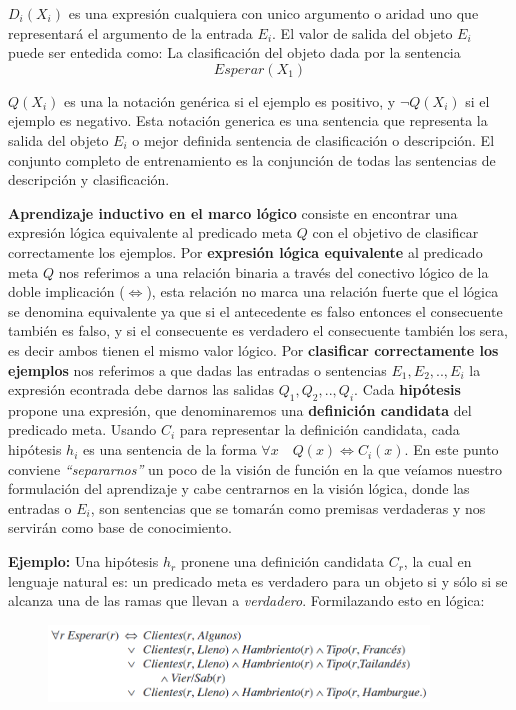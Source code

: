 \documentclass[12 pt, a4paper]{article}
\begin{document}
		\(D_{i}(X_{i})\) es una expresión cualquiera con unico argumento o aridad uno que representará el argumento de la entrada \(E_{i}\). El valor de salida del objeto \(E_{i}\) puede ser entedida como: La clasificación del objeto dada por la sentencia
			\[Esperar(X_{1})\]
			
		\(Q(X_{i})\) es una la notación genérica si el ejemplo es positivo, y \(\neg Q(X_{i})\) si el ejemplo es negativo. Esta notación generica es una sentencia que representa la salida del objeto \(E_{i}\) o mejor definida sentencia de clasificación o descripción. El conjunto completo de entrenamiento es la conjunción de todas las sentencias de descripción y clasificación.
		
		\textbf{Aprendizaje inductivo en el marco lógico} consiste en encontrar una expresión lógica equivalente al predicado meta \(Q\) con el objetivo de clasificar correctamente los ejemplos. Por \textbf{expresión lógica equivalente} al predicado meta \(Q\) nos referimos a una relación binaria a través del conectivo lógico de la doble implicación (\(\iff\)), esta relación no marca una relación fuerte que el lógica se denomina equivalente ya que si el antecedente es falso entonces el consecuente también es falso, y si el consecuente es verdadero el consecuente también los sera, es decir ambos tienen el mismo valor lógico. Por \textbf{clasificar correctamente los ejemplos} nos referimos a que dadas las entradas o sentencias \(E_{1}, E_{2},..,E_{i}\) la expresión econtrada debe darnos las salidas \(Q_{1},Q_{2},..,Q_{i}\). Cada \textbf{hipótesis} propone una expresión, que denominaremos una \textbf{definición candidata} del predicado meta. Usando \(C_{i}\) para representar la definición candidata, cada hipótesis \(h_{i}\) es una sentencia de la forma \(\forall x\quad Q(x) \iff C_{i}(x)\). En este punto conviene \emph{``separarnos''} un poco de la visión de función en la que veíamos nuestro formulación del aprendizaje y cabe centrarnos en la visión lógica, donde las entradas o \(E_{i}\), son sentencias que se tomarán como premisas verdaderas y nos servirán como base de conocimiento. 
		\begin{center}
			\textbf{Ejemplo:} Una hipótesis \(h_{r}\) pronene una definición candidata \(C_{r}\), la cual en lenguaje natural es: un predicado meta es verdadero para un objeto si y sólo si se alcanza una de las ramas que llevan a \emph{verdadero}. Formilazando esto en lógica:
		\end{center}
		\begin{figure}[h]
			\centering
			\includegraphics[width=0.9\textwidth]{candidateDefinition.png}
		\end{figure}
\end{document}
